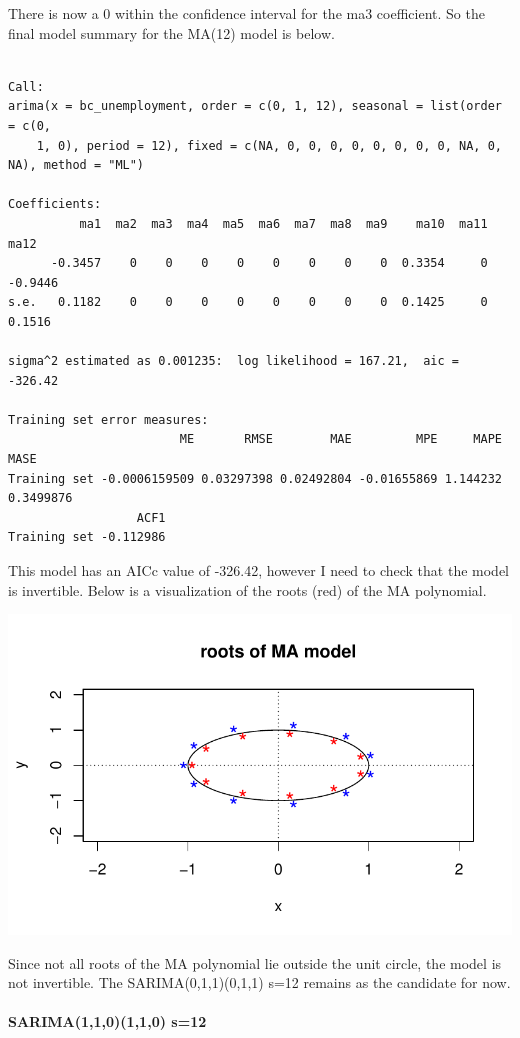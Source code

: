 \documentclass[
  letterpaper,
  DIV=11,
  numbers=noendperiod]{scrartcl}
\let\oldparagraph\paragraph
\renewcommand{\paragraph}[1]{\oldparagraph{#1}\mbox{}}
\begin{document}
There is now a 0 within the confidence interval for the ma3 coefficient.
So the final model summary for the MA(12) model is below.

\begin{verbatim}

Call:
arima(x = bc_unemployment, order = c(0, 1, 12), seasonal = list(order = c(0, 
    1, 0), period = 12), fixed = c(NA, 0, 0, 0, 0, 0, 0, 0, 0, NA, 0, NA), method = "ML")

Coefficients:
          ma1  ma2  ma3  ma4  ma5  ma6  ma7  ma8  ma9    ma10  ma11     ma12
      -0.3457    0    0    0    0    0    0    0    0  0.3354     0  -0.9446
s.e.   0.1182    0    0    0    0    0    0    0    0  0.1425     0   0.1516

sigma^2 estimated as 0.001235:  log likelihood = 167.21,  aic = -326.42

Training set error measures:
                        ME       RMSE        MAE         MPE     MAPE      MASE
Training set -0.0006159509 0.03297398 0.02492804 -0.01655869 1.144232 0.3499876
                  ACF1
Training set -0.112986
\end{verbatim}

This model has an AICc value of -326.42, however I need to check that
the model is invertible. Below is a visualization of the roots (red) of
the MA polynomial.

\includegraphics{Final_Project_files/figure-pdf/unnamed-chunk-24-1.pdf}

Since not all roots of the MA polynomial lie outside the unit circle,
the model is not invertible. The SARIMA(0,1,1)(0,1,1) s=12 remains as
the candidate for now.

\hypertarget{sarima110110-s12}{%
\paragraph{SARIMA(1,1,0)(1,1,0) s=12}\label{sarima110110-s12}}
\end{document}
